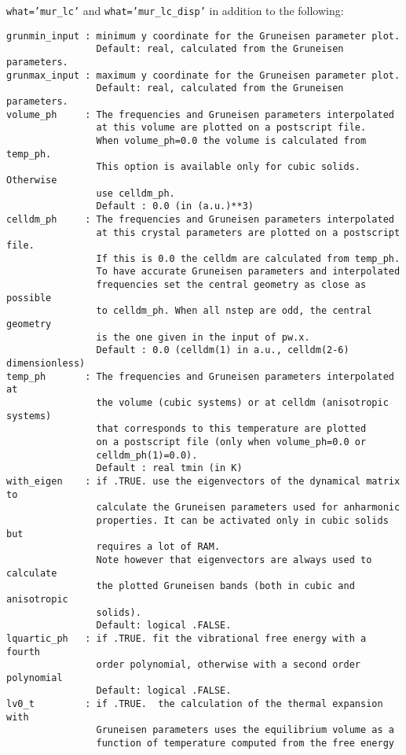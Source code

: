 \documentclass[12pt,a4paper]{article}
\begin{document}
\texttt{what='mur\_lc'} and \texttt{what='mur\_lc\_disp'} in addition to the 
following:
\begin{verbatim}
grunmin_input : minimum y coordinate for the Gruneisen parameter plot.
                Default: real, calculated from the Gruneisen parameters.
grunmax_input : maximum y coordinate for the Gruneisen parameter plot.
                Default: real, calculated from the Gruneisen parameters.
volume_ph     : The frequencies and Gruneisen parameters interpolated 
                at this volume are plotted on a postscript file. 
                When volume_ph=0.0 the volume is calculated from temp_ph.
                This option is available only for cubic solids. Otherwise
                use celldm_ph.
                Default : 0.0 (in (a.u.)**3)
celldm_ph     : The frequencies and Gruneisen parameters interpolated 
                at this crystal parameters are plotted on a postscript file. 
                If this is 0.0 the celldm are calculated from temp_ph.
                To have accurate Gruneisen parameters and interpolated
                frequencies set the central geometry as close as possible 
                to celldm_ph. When all nstep are odd, the central geometry 
                is the one given in the input of pw.x.
                Default : 0.0 (celldm(1) in a.u., celldm(2-6) dimensionless)
temp_ph       : The frequencies and Gruneisen parameters interpolated at 
                the volume (cubic systems) or at celldm (anisotropic systems)
                that corresponds to this temperature are plotted 
                on a postscript file (only when volume_ph=0.0 or 
                celldm_ph(1)=0.0).
                Default : real tmin (in K)
with_eigen    : if .TRUE. use the eigenvectors of the dynamical matrix to
                calculate the Gruneisen parameters used for anharmonic 
                properties. It can be activated only in cubic solids but
                requires a lot of RAM.
                Note however that eigenvectors are always used to calculate
                the plotted Gruneisen bands (both in cubic and anisotropic
                solids).
                Default: logical .FALSE. 
lquartic_ph   : if .TRUE. fit the vibrational free energy with a fourth
                order polynomial, otherwise with a second order polynomial
                Default: logical .FALSE.
lv0_t         : if .TRUE.  the calculation of the thermal expansion with 
                Gruneisen parameters uses the equilibrium volume as a 
                function of temperature computed from the free energy 

\end{verbatim}
\end{document}
